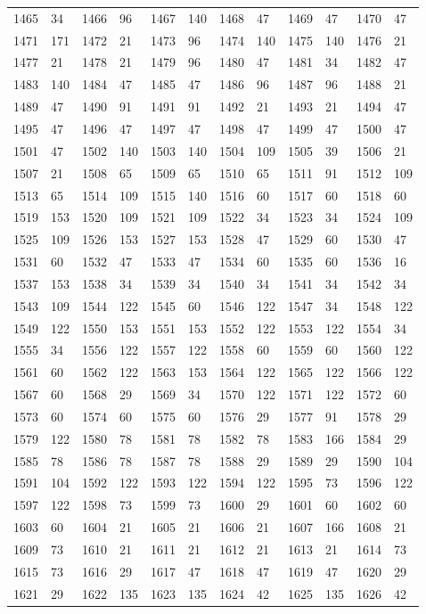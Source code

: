 \begin{longtable}{llllllllllll}
1465 & 34&1466 &96&1467& 140&1468 &47&1469 &47&1470& 47\\
1471 & 171&1472 &21&1473& 96&1474 &140&1475 &140&1476& 21\\
1477 & 21&1478 &21&1479& 96&1480 &47&1481 &34&1482& 47\\
1483 & 140&1484 &47&1485& 47&1486 &96&1487 &96&1488& 21\\
1489 & 47&1490 &91&1491& 91&1492 &21&1493 &21&1494& 47\\
1495 & 47&1496 &47&1497& 47&1498 &47&1499 &47&1500& 47\\
1501 & 47&1502 &140&1503& 140&1504 &109&1505 &39&1506& 21\\
1507 & 21&1508 &65&1509& 65&1510 &65&1511 &91&1512& 109\\
1513 & 65&1514 &109&1515& 140&1516 &60&1517 &60&1518& 60\\
1519 & 153&1520 &109&1521& 109&1522 &34&1523 &34&1524& 109\\
1525 & 109&1526 &153&1527& 153&1528 &47&1529 &60&1530& 47\\
1531 & 60&1532 &47&1533& 47&1534 &60&1535 &60&1536& 16\\
1537 & 153&1538 &34&1539& 34&1540 &34&1541 &34&1542& 34\\
1543 & 109&1544 &122&1545& 60&1546 &122&1547 &34&1548& 122\\
1549 & 122&1550 &153&1551& 153&1552 &122&1553 &122&1554& 34\\
1555 & 34&1556 &122&1557& 122&1558 &60&1559 &60&1560& 122\\
1561 & 60&1562 &122&1563& 153&1564 &122&1565 &122&1566& 122\\
1567 & 60&1568 &29&1569& 34&1570 &122&1571 &122&1572& 60\\
1573 & 60&1574 &60&1575& 60&1576 &29&1577 &91&1578& 29\\
1579 & 122&1580 &78&1581& 78&1582 &78&1583 &166&1584& 29\\
1585 & 78&1586 &78&1587& 78&1588 &29&1589 &29&1590& 104\\
1591 & 104&1592 &122&1593& 122&1594 &122&1595 &73&1596& 122\\
1597 & 122&1598 &73&1599& 73&1600 &29&1601 &60&1602& 60\\
1603 & 60&1604 &21&1605& 21&1606 &21&1607 &166&1608& 21\\
1609 & 73&1610 &21&1611& 21&1612 &21&1613 &21&1614& 73\\
1615 & 73&1616 &29&1617& 47&1618 &47&1619 &47&1620& 29\\
1621 & 29&1622 &135&1623& 135&1624 &42&1625 &135&1626& 42\\

\end{longtable}
